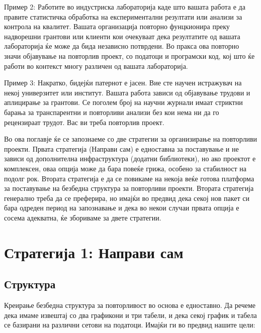 \documentclass[
]{book}
\begin{document}
Пример 2: Работите во индустриска лабораторија каде што вашата работа е да правите статистичка обработка на експериментални резултати или анализи за контрола на квалитет. Вашата организација повторно фунцкионира преку надворешни грантови или клиенти кои очекуваат дека резултатите од вашата лабораторија ќе може да бида независно потврдени. Во пракса ова повторно значи објавување на повторлив проект, со податоци и програмски код, кој што ќе работи во контекст многу различен од вашата лабораторија.

Пример 3: Накратко, бидејќи патернот е јасен. Вие сте научен истражувач на некој универзитет или институт. Вашата работа зависи од објавување трудови и аплицирање за грантови. Се поголем број на научни журнали имаат стриктни барања за транспарентни и повторливи анализи без кои нема ни да го рецензираат трудот. Вас ви треба повторлив проект.

Во ова поглавје ќе се запознаеме со две стратегии за организирање на повторливи проекти. Првата стратегија (Направи сам) е едноставна за поставување и не зависи од дополнителна инфраструктура (додатни библиотеки), но ако проектот е комплексен, оваа опција може да бара повеќе грижа, особено за стабилност на подолг рок. Втората стратегија е да се повикаме на некоја веќе готова платформа за поставување на безбедна структура за повторливи проекти. Втората стратегија генерално треба да се преферира, но имајќи во предвид дека секој нов пакет си бара одреден период на запознавање и дека во некои случаи првата опција е сосема адекватна, ќе збориваме за двете стратегии.

\hypertarget{ux441ux442ux440ux430ux442ux435ux433ux438ux458ux430-1-ux43dux430ux43fux440ux430ux432ux438-ux441ux430ux43c}{%
\section{Стратегија 1: Направи сам}\label{ux441ux442ux440ux430ux442ux435ux433ux438ux458ux430-1-ux43dux430ux43fux440ux430ux432ux438-ux441ux430ux43c}}

\hypertarget{ux441ux442ux440ux443ux43aux442ux443ux440ux430}{%
\subsection{Структура}\label{ux441ux442ux440ux443ux43aux442ux443ux440ux430}}

Креирање безбедна структура за повторливост во основа е едноставно. Да речеме дека имаме извештај со два графикони и три табели, и дека секој график и табела се базирани на различни сетови на податоци. Имајќи ги во предвид нашите цели:
\end{document}

